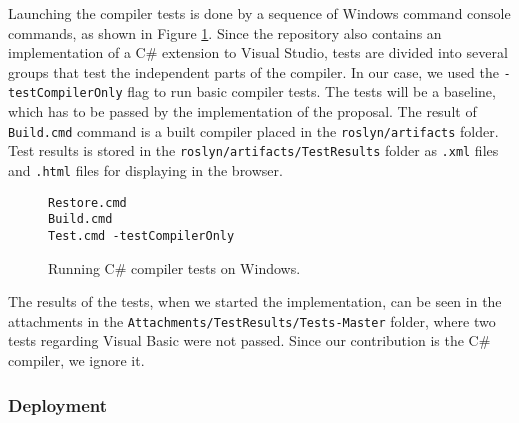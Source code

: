 Launching the compiler tests is done by a sequence of Windows command console commands, as shown in Figure \ref{img65:runTests}. 
Since the repository also contains an implementation of a C\# extension to Visual Studio, tests are divided into several groups that test the independent parts of the compiler. 
In our case, we used the \texttt{-testCompilerOnly} flag to run basic compiler tests. 
The tests will be a baseline, which has to be passed by the implementation of the proposal. 
The result of \texttt{Build.cmd} command is a built compiler placed in the \texttt{roslyn/artifacts} folder. 
Test results is stored in the \texttt{roslyn/artifacts/TestResults} folder as \texttt{.xml} files and \texttt{.html} files for displaying in the browser.
\begin{figure}[h]
\begin{lstlisting}
Restore.cmd
Build.cmd
Test.cmd -testCompilerOnly
\end{lstlisting}
\caption{Running C\# compiler tests on Windows.}
\label{img65:runTests}
\end{figure}
\par
The results of the tests, when we started the implementation, can be seen in the attachments in the \texttt{Attachments/TestResults/Tests-Master} folder, where two tests regarding Visual Basic were not passed. 
Since our contribution is the C\# compiler, we ignore it.

\subsubsection{Deployment}

